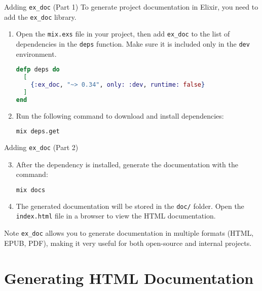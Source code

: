 \documentclass[aspectratio=169, table]{beamer}
\begin{document}
\begin{frame}[fragile]{Adding \texttt{ex\_doc} (Part 1)}
\vspace{15pt}
To generate project documentation in Elixir,  
you need to add the \texttt{ex\_doc} library.  

\begin{enumerate}
  \item Open the \texttt{mix.exs} file in your project,  
        then add \texttt{ex\_doc} to the list of dependencies  
        in the \texttt{deps} function. Make sure it is included only in the \texttt{dev} environment.  

\begin{lstlisting}[language=Elixir]
defp deps do
  [
    {:ex_doc, "~> 0.34", only: :dev, runtime: false}
  ]
end
\end{lstlisting}

  \item Run the following command to download and install dependencies:  
\begin{lstlisting}[language=bash]
mix deps.get
\end{lstlisting}
\end{enumerate}
\end{frame}


\begin{frame}[fragile]{Adding \texttt{ex\_doc} (Part 2)}
\vspace{15pt}
\begin{enumerate}
  \setcounter{enumi}{2}
  \item After the dependency is installed,  
        generate the documentation with the command:  

\begin{lstlisting}[language=bash]
mix docs
\end{lstlisting}

  \item The generated documentation will be stored in the \texttt{doc/} folder.  
        Open the \texttt{index.html} file in a browser to view the HTML documentation.
\end{enumerate}

\begin{block}{Note}
\texttt{ex\_doc} allows you to generate documentation  
in multiple formats (HTML, EPUB, PDF),  
making it very useful for both open-source and internal projects.
\end{block}
\end{frame}

\section{Generating HTML Documentation}
\end{document}
